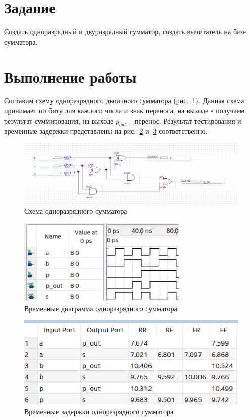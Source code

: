 \documentclass[a4paper,14pt]{article}
\begin{document}

\tableofcontents
\pagebreak

\section{Задание}

Создать одноразрядный и двуразрядный сумматор, создать вычитатель на базе сумматора.

\section{Выполнение работы}

Составим схему одноразрядного двоичного сумматора  (рис.~\ref{fig:schema_1}).
Данная схема принимает по биту для каждого числа и знак переноса, на выходе s получаем результат суммирования, на выходе $p_{out}$ -- перенос.
Результат тестирования и временные задержки представлены на рис.~\ref{fig:wave_1} и~\ref{fig:time_1} соответственно.

\begin{figure}[H]
	\centering
	\includegraphics[width=\linewidth]{image/schema_1}
	\caption{Схема одноразрядного сумматора}
	\label{fig:schema_1}
\end{figure}

\begin{figure}[H]
	\centering
	\includegraphics[width=0.5\linewidth]{image/wave_1}
	\caption{Временные диаграмма одноразрядного сумматора}
	\label{fig:wave_1}
\end{figure}

\begin{figure}[H]
	\centering
	\includegraphics[width=0.7\linewidth]{image/time_1}
	\caption{Временные задержки одноразрядного сумматора}
	\label{fig:time_1}
\end{figure}
\end{document}
